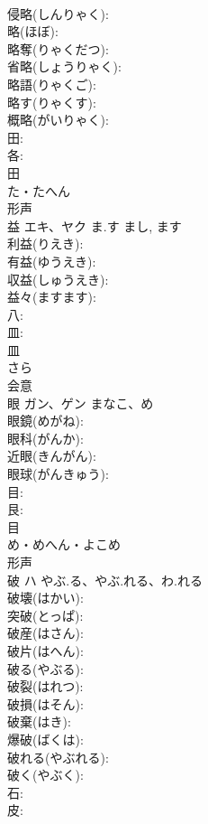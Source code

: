 \documentclass[8pt]{extreport}
\begin{document}
\begin{CJK}{UTF8}{min}
\\	侵略(しんりゃく): 
\\	略(ほぼ): 
\\	略奪(りゃくだつ): 
\\	省略(しょうりゃく): 
\\	略語(りゃくご): 
\\	略す(りゃくす): 
\\	概略(がいりゃく): 
\\	田: 
\\	各: 
\\	田	
\\	た・たへん	
\\	形声 
\\	益	エキ、ヤク	ま.す	まし, ます	
\\	利益(りえき): 
\\	有益(ゆうえき): 
\\	収益(しゅうえき): 
\\	益々(ますます): 
\\	八: 
\\	皿: 
\\	皿	
\\	さら	
\\	会意 
\\	眼	ガン、ゲン	まなこ、め		
\\	眼鏡(めがね): 
\\	眼科(がんか): 
\\	近眼(きんがん): 
\\	眼球(がんきゅう): 
\\	目: 
\\	艮: 
\\	目	
\\	め・めへん・よこめ	
\\	形声 
\\	破	ハ	やぶ.る、やぶ.れる、わ.れる		
\\	破壊(はかい): 
\\	突破(とっぱ): 
\\	破産(はさん): 
\\	破片(はへん): 
\\	破る(やぶる): 
\\	破裂(はれつ): 
\\	破損(はそん): 
\\	破棄(はき): 
\\	爆破(ばくは): 
\\	破れる(やぶれる): 
\\	破く(やぶく): 
\\	石: 
\\	皮: 

\end{CJK}
\end{document}
